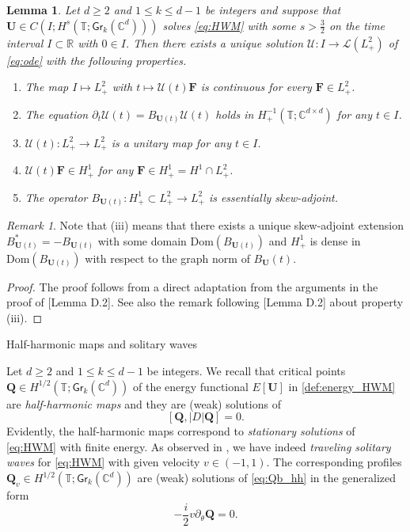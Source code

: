 \documentclass[10pt,reqno,a4paper]{amsart}
\makeatletter
\newtheorem{lem}{Lemma}[section]
\theoremstyle{definition}
\theoremstyle{remark}
\theoremstyle{remark}
\newtheorem*{remark*}{Remark}
\numberwithin{equation}{section}
\newcommand{\C}{\mathbb{C}}
\newcommand{\R}{\mathbb{R}}
\newcommand{\T}{\mathbb{T}}
\newcommand{\dom}{\mathrm{Dom}}
\newcommand{\pt}{\partial}
\newcommand{\be}{\begin{equation}}
\newcommand{\ee}{\end{equation}}
\newcommand{\Ub}{\mathbf{U}}
\newcommand{\Fb}{\mathbf{F}}
\newcommand{\Gr}{\mathsf{Gr}}
\newcommand{\Us}{\mathscr{U}}
\newcommand{\Ls}{\mathscr{L}}
\newcommand{\Qb}{\mathbf{Q}}
\def\section{\@startsection{section}{1}%
  \z@{1.5\linespacing\@plus\linespacing}{.5\linespacing}%
  {\normalfont\bfseries\large\centering}}
\makeatother
\begin{document}
\begin{appendix}
\begin{lem}
Let $d \geq 2$ and $1 \leq k \leq d-1$ be integers and suppose that $\Ub \in C(I; H^s(\T; \Gr_k(\C^d)))$ solves \eqref{eq:HWM} with some $s > \frac{3}{2}$ on the time interval $I \subset \R$ with $0 \in I$. Then there exists a unique solution $\Us : I \to \Ls(L^2_+)$ of \eqref{eq:ode} with the following properties.
\begin{enumerate}
\item[(i)] The map $I \mapsto L^2_+$ with $t \mapsto \Us(t) \Fb$ is continuous for every $\Fb \in L^2_+$.
\item[(ii)] The equation $\pt_t \Us(t) = B_{\Ub(t)} \Us(t)$ holds in $H^{-1}_+(\T; \C^{d \times d})$ for any $t \in I$. 
\item[(iii)] $\Us(t) : L^2_+ \to L^2_+$ is a unitary map for any $t \in I$.
\item[(iv)] $\Us(t) \Fb \in H^1_+$ for any $\Fb \in H^1_+ = H^1 \cap L^2_+$.
\item[(v)] The operator $B_{\Ub(t)} : H^1_+ \subset L^2_+ \to L^2_+$ is essentially skew-adjoint.
\end{enumerate}
\end{lem}

\begin{remark*}
Note that (iii) means that there exists a unique skew-adjoint extension $B_{\Ub(t)}^* = -B_{\Ub(t)}$ with some domain $\dom(B_{\Ub(t)})$ and $H^1_+$ is dense in $\dom(B_{\Ub(t)})$  with respect to the graph norm of $B_\Ub(t)$.
\end{remark*}

\begin{proof}
The proof follows from a direct adaptation from the arguments in the proof of \cite{GeLe-25}[Lemma D.2]. See also the remark following \cite{GeLe-25}[Lemma D.2] about property (iii). 
\end{proof}



\section{Half-harmonic maps and solitary waves}

Let $d \geq 2$ and $1 \leq k \leq d-1$ be integers. We recall that critical points $\Qb \in H^{1/2}(\T; \Gr_k(\C^d))$ of the energy functional $E[\Ub]$ in \eqref{def:energy_HWM} are {\em half-harmonic maps} and they are (weak) solutions of 
\be \label{eq:Qb_hh}
[\Qb, |D| \Qb] = 0 .
\ee
Evidently, the half-harmonic maps   correspond to {\em stationary solutions} of \eqref{eq:HWM} with finite energy. As observed in \cite{LeSc-18}, we have indeed {\em traveling solitary waves} for \eqref{eq:HWM} with given velocity $v \in (-1,1)$. The corresponding profiles $\Qb_v \in H^{1/2}(\T; \Gr_k(\C^d))$ are (weak) solutions of \eqref{eq:Qb_hh} in the generalized form
\be
[\Qb, |D| \Qb] - \frac{i}{2} v\pt_\theta \Qb = 0.
\ee 


\end{appendix}
\end{document}
